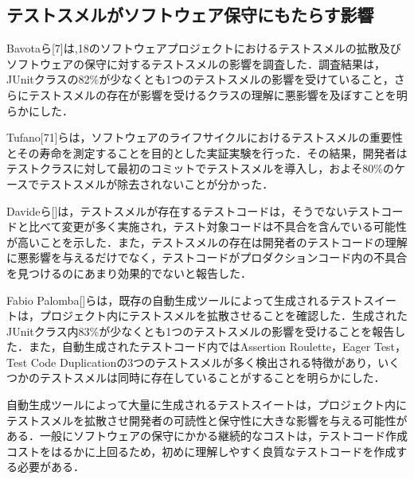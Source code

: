\documentclass[12pt]{jarticle} %
\begin{document}
\subsection{テストスメルがソフトウェア保守にもたらす影響}

Bavotaら[7]は,18のソフトウェアプロジェクトにおけるテストスメルの拡散及びソフトウェアの保守に対するテストスメルの影響を調査した．調査結果は，JUnitクラスの82\%が少なくとも1つのテストスメルの影響を受けていること，さらにテストスメルの存在が影響を受けるクラスの理解に悪影響を及ぼすことを明らかにした．

Tufano[71]らは，ソフトウェアのライフサイクルにおけるテストスメルの重要性とその寿命を測定することを目的とした実証実験を行った．その結果，開発者はテストクラスに対して最初のコミットでテストスメルを導入し，およそ80\%のケースでテストスメルが除去されないことが分かった．

Davideら[]は，テストスメルが存在するテストコードは，そうでないテストコードと比べて変更が多く実施され，テスト対象コードは不具合を含んでいる可能性が高いことを示した．また，テストスメルの存在は開発者のテストコードの理解に悪影響を与えるだけでなく，テストコードがプロダクションコード内の不具合を見つけるのにあまり効果的でないと報告した．

Fabio Palomba[]らは，既存の自動生成ツールによって生成されるテストスイートは，プロジェクト内にテストスメルを拡散させることを確認した．生成されたJUnitクラス内83\%が少なくとも1つのテストスメルの影響を受けることを報告した．また，自動生成されたテストコード内ではAssertion Roulette，Eager Test，Test Code Duplicationの3つのテストスメルが多く検出される特徴があり，いくつかのテストスメルは同時に存在していることがすることを明らかにした．

自動生成ツールによって大量に生成されるテストスイートは，プロジェクト内にテストスメルを拡散させ開発者の可読性と保守性に大きな影響を与える可能性がある．一般にソフトウェアの保守にかかる継続的なコストは，テストコード作成コストをはるかに上回るため，初めに理解しやすく良質なテストコードを作成する必要がある．
\end{document}
